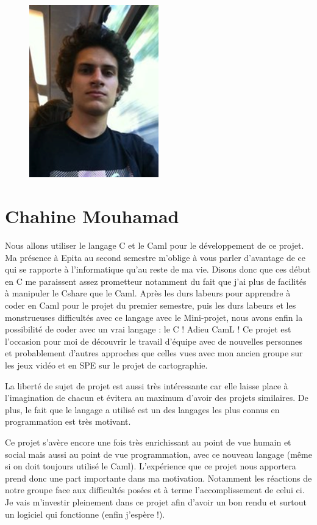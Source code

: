 \documentclass[12pt, a4paper]{report}
\begin{document}
\begin{figure}[!h]
\begin{center} \includegraphics[width=0.5\textwidth]{images/sallah.png} \end{center}
\end{figure}


\newpage



\section{Chahine Mouhamad}

\par Nous allons utiliser le langage C et le Caml pour le développement de ce projet. Ma présence à Epita au second semestre m’oblige à vous parler d’avantage de ce qui se rapporte à l’informatique qu’au reste de ma vie. Disons donc que ces début en C me paraissent assez prometteur notamment du fait que j’ai plus de facilités à manipuler le Cshare que le Caml. Après les durs labeurs pour apprendre à coder en Caml pour le projet du premier semestre, puis les durs labeurs et les monstrueuses difficultés avec ce langage avec le Mini-projet, nous avons enfin la possibilité de coder avec un vrai langage : le C ! Adieu CamL ! Ce projet est l’occasion pour moi de découvrir le travail d’équipe avec de nouvelles personnes et probablement d’autres approches que celles vues avec mon ancien groupe sur les jeux vidéo et en SPE sur le projet de cartographie.
     \par    La liberté de sujet de projet est aussi très intéressante car elle laisse place à l’imagination de chacun et évitera au maximum d’avoir des projets similaires. De plus, le fait que le langage a utilisé est un des langages les plus connus en programmation est très motivant. 
\par Ce projet s’avère encore une fois très enrichissant au point de vue humain et social mais aussi au point de vue programmation, avec ce nouveau langage (même si on doit toujours utilisé le Caml). L’expérience que ce projet nous apportera prend donc une part importante dans ma motivation. Notamment les réactions de notre groupe face aux difficultés posées et à terme l’accomplissement de celui ci. Je vais m’investir pleinement dans ce projet afin d’avoir un bon rendu et surtout un logiciel qui fonctionne (enfin j’espère !).
\end{document}
